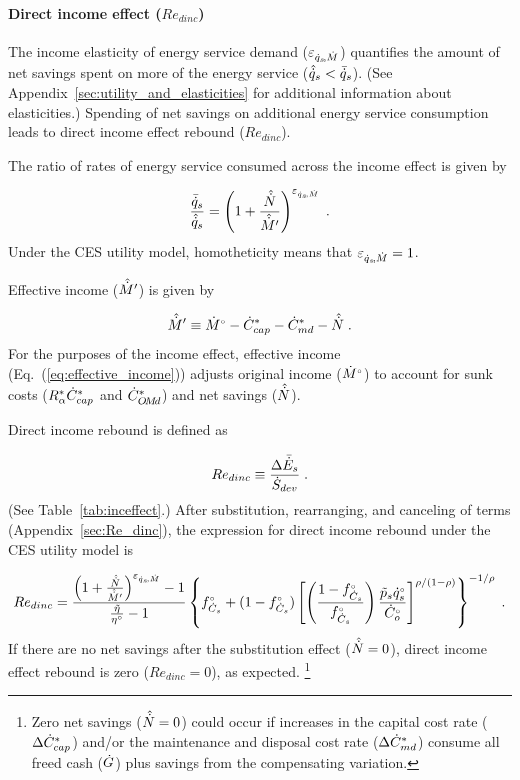 \documentclass[12pt]{article}\usepackage[]{graphicx}\usepackage[]{xcolor}
\begin{document}
\paragraph{Direct income effect ($Re_{dinc}$)} 
\label{sec:direct_income_effect}

The income elasticity of energy service demand ($\varepsilon_{\dot{q}_s\!,\dot{M}}$)
quantifies the amount of net savings spent 
on more of the energy service ($\hat{\dot{q}}_s < \bar{\dot{q}}_s$).
(See Appendix~\ref{sec:utility_and_elasticities} 
for additional information about elasticities.)
Spending of net savings on additional energy service consumption
leads to direct income effect rebound ($Re_{dinc}$).

The ratio of rates of energy service consumed across the income effect 
is given by

\begin{equation} \label{eq:qsrat_eqsM}
  \frac{\bar{\dot{q}}_s}{\hat{\dot{q}}_s} = \left( 1 + \frac{\hat{\dot{N}}}{\hat{\dot{M}}^\prime} \right) ^{\varepsilon_{\dot{q}_s\!,\dot{M}}} \; .
\end{equation}
%
Under the CES utility model, homotheticity means that $\varepsilon_{\dot{q}_s\!,\dot{M}} = 1$. 

Effective income ($\hat{\dot{M}}^\prime$) is given by 

\begin{equation} \label{eq:effective_income}
  \hat{\dot{M}}^\prime \equiv {}{\dot{M}}^{\scriptscriptstyle \circ} - {\dot{C}}^*_{cap} - {\dot{C}}^*_{md} - \hat{\dot{N}}{} \; .
\end{equation}
%
For the purposes of the income effect, 
effective income (Eq.~(\ref{eq:effective_income})) 
adjusts original income (${}{\dot{M}}^{\scriptscriptstyle \circ}$) to account for 
sunk costs (${R}^*_\alpha {\dot{C}}^*_{cap}$ and ${\dot{C}}^*_{O\!M\!d}$) and
net savings ($\hat{\dot{N}}$).

Direct income rebound is defined as

\begin{equation} \label{eq:Re_dinc_def}
  Re_{dinc} \equiv \frac{\Delta \bar{\dot{E}}_s}{\dot{S}_{dev}} \; .
\end{equation}
%
(See Table~\ref{tab:inceffect}.)
After substitution, rearranging, and canceling of terms (Appendix~\ref{sec:Re_dinc}), 
the expression for direct income rebound under the CES utility model is

\begin{equation} \label{eq:Re_dinc}
  Re_{dinc} = \frac{ \left( 1 + \frac{\hat{\dot{N}}}{\hat{\dot{M}}^\prime} \right) ^{\varepsilon_{\dot{q}_s\!,\dot{M}}} - 1} { \frac{\tilde{\eta}}{{}{\eta}^{\scriptscriptstyle \circ}} - 1 } \left\{ {}{f}^{\scriptscriptstyle \circ}_{\dot{C}_s} + (1-{}{f}^{\scriptscriptstyle \circ}_{\dot{C}_s}) \left[ \left( \frac{1-{}{f}^{\scriptscriptstyle \circ}_{\dot{C}_s}}{{}{f}^{\scriptscriptstyle \circ}_{\dot{C}_s}} \right) \frac{\tilde{p}_s {}{\dot{q}}^{\scriptscriptstyle \circ}_s}{{}{\dot{C}}^{\scriptscriptstyle \circ}_o} \right] ^{\rho / (1 - \rho)} \right\} ^ {-1/\rho}{}{} \; .
\end{equation}
%
If there are no net savings after the substitution effect ($\hat{\dot{N}} = 0$), 
direct income effect rebound is zero ($Re_{dinc} = 0$), as expected.%
\footnote{
  Zero net savings ($\hat{\dot{N}} = 0$) could occur if 
  increases in the capital cost rate ($\Delta {\dot{C}}^*_{cap}$) and/or
  the maintenance and disposal cost rate ($\Delta {\dot{C}}^*_{md}$)
  consume all freed cash ($\dot{G}$) plus savings from the compensating variation.
}
\end{document}
